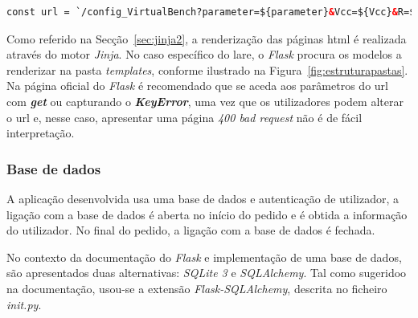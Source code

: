 \begin{minipage}{0.9\linewidth}
	\begin{lstlisting}[language=Html, caption=Exemplo argumentos passados ao servidor - ohm.html, label=lst:paramurl]
const url = `/config_VirtualBench?parameter=${parameter}&Vcc=${Vcc}&R=${Resistance}`;
\end{lstlisting}
\end{minipage}

Como referido na Secção~\ref{sec:jinja2}, a renderização das páginas \acrshort{html} é realizada através do motor \textit{Jinja}. No caso específico do \acrshort{lare}, o \textit{Flask} procura os modelos a renderizar na pasta \textit{templates}, conforme ilustrado na Figura~\ref{fig:estruturapastas}. Na página oficial do \textit{Flask} é recomendado que se aceda aos parâmetros do \acrshort{url} com \textit{\textbf{get}} ou capturando o \textit{\textbf{KeyError}}, uma vez que os utilizadores podem alterar o \acrshort{url} e, nesse caso, apresentar uma página \textit{400 bad request} não é de fácil interpretação.

\subsubsection{Base de dados}
A aplicação desenvolvida usa uma base de dados e autenticação de utilizador, a ligação com a base de dados é aberta no início do pedido e é obtida a informação do utilizador. No final do pedido, a ligação com a base de dados é fechada. 

No contexto da documentação do \textit{Flask} e implementação de uma base de dados, são apresentados duas alternativas: \textit{SQLite 3} e \textit{SQLAlchemy}. Tal como sugeridoo na documentação, usou-se a extensão \textit{Flask-SQLAlchemy}, descrita no ficheiro \textit{\textunderscore\textunderscore init.py\textunderscore\textunderscore}.

